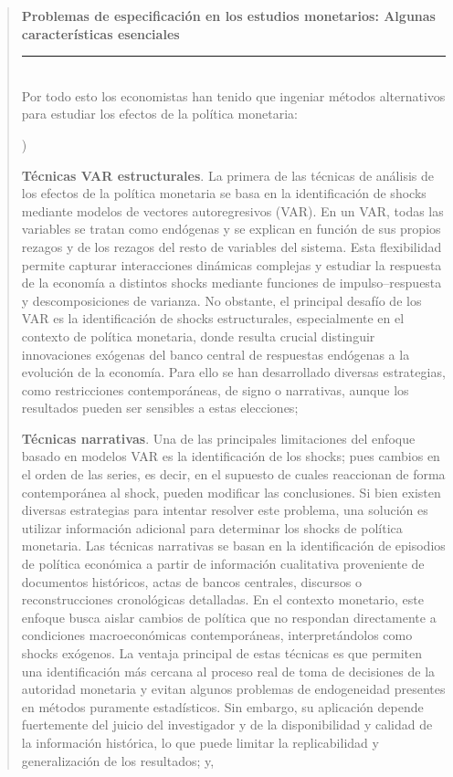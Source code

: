 \documentclass[10pt,a4paper]{article}
\newcounter{alphaitem}
\newenvironment{la}
      {\begin{list}{\alph{alphaitem})}{%
          \usecounter{alphaitem}%
          \setlength{\leftmargin}{1cm}%
          \setlength{\parskip}{3pt}%
          \setlength{\itemsep}{0pt}%
          \setlength{\parsep}{0pt}%
      }}
      {\end{list}}
\newenvironment{specialblock}[1]{%
      \begin{quote} %
      \small %
      \noindent\textbf{#1}\\[-0.3em] %
      \rule{\linewidth}{0.4pt}\\[0.6em]}{
      \end{quote}}
\begin{document}
\begin{specialblock}{\textbf{Problemas de especificación en los estudios monetarios}: Algunas características esenciales}
    Por todo esto los economistas han tenido que ingeniar métodos alternativos para estudiar los efectos de la política monetaria:
    \begin{la}
        \item \textbf{Técnicas VAR estructurales}. La primera de las técnicas de análisis de los efectos de la política monetaria se basa en la identificación de shocks mediante modelos de vectores autoregresivos (VAR). En un VAR, todas las variables se tratan como endógenas y se explican en función de sus propios rezagos y de los rezagos del resto de variables del sistema. Esta flexibilidad permite capturar interacciones dinámicas complejas y estudiar la respuesta de la economía a distintos shocks mediante funciones de impulso–respuesta y descomposiciones de varianza. No obstante, el principal desafío de los VAR es la identificación de shocks estructurales, especialmente en el contexto de política monetaria, donde resulta crucial distinguir innovaciones exógenas del banco central de respuestas endógenas a la evolución de la economía. Para ello se han desarrollado diversas estrategias, como restricciones contemporáneas, de signo o narrativas, aunque los resultados pueden ser sensibles a estas elecciones;
        \item \textbf{Técnicas narrativas}. Una de las principales limitaciones del enfoque basado en modelos VAR es la identificación de los shocks; pues cambios en el orden de las series, es decir, en el supuesto de cuales reaccionan de forma contemporánea al shock, pueden modificar las conclusiones. Si bien existen diversas estrategias para intentar resolver este problema, una solución es utilizar información adicional para determinar los shocks de política monetaria. Las técnicas narrativas se basan en la identificación de episodios de política económica a partir de información cualitativa proveniente de documentos históricos, actas de bancos centrales, discursos o reconstrucciones cronológicas detalladas. En el contexto monetario, este enfoque busca aislar cambios de política que no respondan directamente a condiciones macroeconómicas contemporáneas, interpretándolos como shocks exógenos. La ventaja principal de estas técnicas es que permiten una identificación más cercana al proceso real de toma de decisiones de la autoridad monetaria y evitan algunos problemas de endogeneidad presentes en métodos puramente estadísticos. Sin embargo, su aplicación depende fuertemente del juicio del investigador y de la disponibilidad y calidad de la información histórica, lo que puede limitar la replicabilidad y generalización de los resultados; y,

\end{la}
\end{specialblock}
\end{document}
